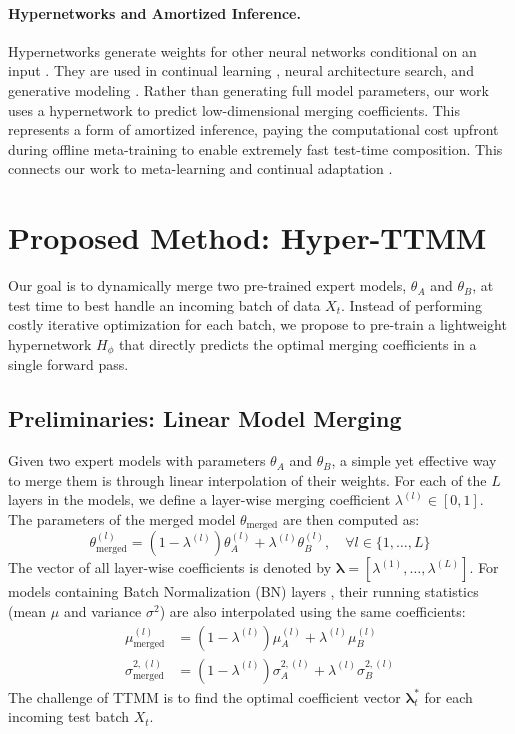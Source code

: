 \documentclass{article}
\theoremstyle{plain}
\theoremstyle{definition}
\theoremstyle{remark}
\begin{document}
\paragraph{Hypernetworks and Amortized Inference.}
Hypernetworks generate weights for other neural networks conditional on an input \citep{ha2016hypernetworks}. They are used in continual learning \citep{schwarz2018progress}, neural architecture search, and generative modeling \citep{goodfellow2014generative}. Rather than generating full model parameters, our work uses a hypernetwork to predict low-dimensional merging coefficients. This represents a form of amortized inference, paying the computational cost upfront during offline meta-training to enable extremely fast test-time composition. This connects our work to meta-learning \citep{NIPS2017_9d7c6255, NEURIPS2019_9015} and continual adaptation \citep{rebuffi2017icarl, li2017learning}.

\section{Proposed Method: Hyper-TTMM}
\label{sec:method}
Our goal is to dynamically merge two pre-trained expert models, $\theta_A$ and $\theta_B$, at test time to best handle an incoming batch of data $X_t$. Instead of performing costly iterative optimization for each batch, we propose to pre-train a lightweight hypernetwork $H_\phi$ that directly predicts the optimal merging coefficients in a single forward pass.

\subsection{Preliminaries: Linear Model Merging}
Given two expert models with parameters $\theta_A$ and $\theta_B$, a simple yet effective way to merge them is through linear interpolation of their weights. For each of the $L$ layers in the models, we define a layer-wise merging coefficient $\lambda^{(l)} \in [0, 1]$. The parameters of the merged model $\theta_{\text{merged}}$ are then computed as:
\begin{equation}
\theta_{\text{merged}}^{(l)} = (1 - \lambda^{(l)}) \theta_A^{(l)} + \lambda^{(l)} \theta_B^{(l)}, \quad \forall l \in \{1, \dots, L\}
\end{equation}
The vector of all layer-wise coefficients is denoted by $\boldsymbol{\lambda} = [\lambda^{(1)}, \dots, \lambda^{(L)}]$. For models containing Batch Normalization (BN) layers \citep{ioffe2015batch}, their running statistics (mean $\mu$ and variance $\sigma^2$) are also interpolated using the same coefficients:
\begin{align}
\mu_{\text{merged}}^{(l)} &= (1 - \lambda^{(l)}) \mu_A^{(l)} + \lambda^{(l)} \mu_B^{(l)} \\
\sigma_{\text{merged}}^{2, (l)} &= (1 - \lambda^{(l)}) \sigma_A^{2, (l)} + \lambda^{(l)} \sigma_B^{2, (l)}
\end{align}
The challenge of TTMM is to find the optimal coefficient vector $\boldsymbol{\lambda}^*_t$ for each incoming test batch $X_t$.
\end{document}
